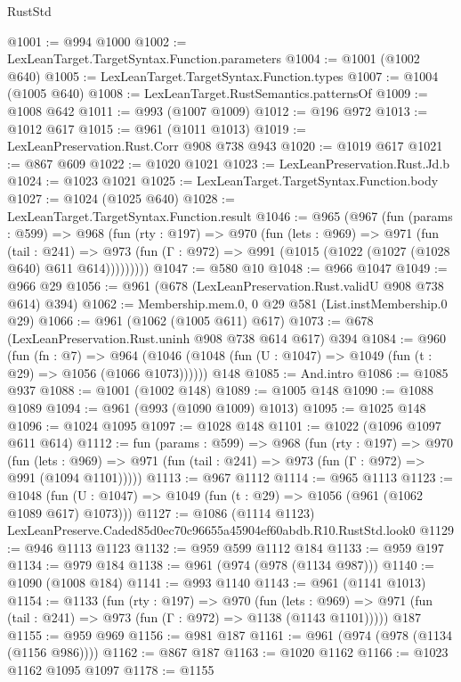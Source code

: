 \begin{lexlean}{RustStd}
\begin{coremodule}
@1001 := @994 @1000
@1002 := LexLeanTarget.TargetSyntax.Function.parameters
@1004 := @1001 (@1002 @640)
@1005 := LexLeanTarget.TargetSyntax.Function.types
@1007 := @1004 (@1005 @640)
@1008 := LexLeanTarget.RustSemantics.patternsOf
@1009 := @1008 @642
@1011 := @993 (@1007 @1009)
@1012 := @196 @972
@1013 := @1012 @617
@1015 := @961 (@1011 @1013)
@1019 := LexLeanPreservation.Rust.Corr @908 @738 @943
@1020 := @1019 @617
@1021 := @867 @609
@1022 := @1020 @1021
@1023 := LexLeanPreservation.Rust.Jd.b
@1024 := @1023 @1021
@1025 := LexLeanTarget.TargetSyntax.Function.body
@1027 := @1024 (@1025 @640)
@1028 := LexLeanTarget.TargetSyntax.Function.result
@1046 := @965
    (@967
      (fun (params : @599) =>
      @968
        (fun (rty : @197) =>
        @970
          (fun (lets : @969) =>
          @971
            (fun (tail : @241) =>
            @973 (fun (Γ : @972) => @991 (@1015 (@1022 (@1027 (@1028 @640) @611 @614)))))))))
@1047 := @580 @10
@1048 := @966 @1047
@1049 := @966 @29
@1056 := @961 (@678 (LexLeanPreservation.Rust.validU @908 @738 @614) @394)
@1062 := Membership.mem.{0, 0} @29 @581 (List.instMembership.{0} @29)
@1066 := @961 (@1062 (@1005 @611) @617)
@1073 := @678 (LexLeanPreservation.Rust.uninh @908 @738 @614 @617) @394
@1084 := @960
    (fun (fn : @7) =>
    @964 (@1046 (@1048 (fun (U : @1047) => @1049 (fun (t : @29) => @1056 (@1066 @1073))))))
    @148
@1085 := And.intro
@1086 := @1085 @937
@1088 := @1001 (@1002 @148)
@1089 := @1005 @148
@1090 := @1088 @1089
@1094 := @961 (@993 (@1090 @1009) @1013)
@1095 := @1025 @148
@1096 := @1024 @1095
@1097 := @1028 @148
@1101 := @1022 (@1096 @1097 @611 @614)
@1112 := fun (params : @599) =>
  @968
    (fun (rty : @197) =>
    @970
      (fun (lets : @969) =>
      @971 (fun (tail : @241) => @973 (fun (Γ : @972) => @991 (@1094 @1101)))))
@1113 := @967 @1112
@1114 := @965 @1113
@1123 := @1048 (fun (U : @1047) => @1049 (fun (t : @29) => @1056 (@961 (@1062 @1089 @617) @1073)))
@1127 := @1086 (@1114 @1123) LexLeanPreserve.Caded85d0ec70c96655a45904ef60abdb.R10.RustStd.look0
@1129 := @946 @1113 @1123
@1132 := @959 @599 @1112 @184
@1133 := @959 @197
@1134 := @979 @184
@1138 := @961 (@974 (@978 (@1134 @987)))
@1140 := @1090 (@1008 @184)
@1141 := @993 @1140
@1143 := @961 (@1141 @1013)
@1154 := @1133
    (fun (rty : @197) =>
    @970
      (fun (lets : @969) =>
      @971 (fun (tail : @241) => @973 (fun (Γ : @972) => @1138 (@1143 @1101)))))
    @187
@1155 := @959 @969
@1156 := @981 @187
@1161 := @961 (@974 (@978 (@1134 (@1156 @986))))
@1162 := @867 @187
@1163 := @1020 @1162
@1166 := @1023 @1162 @1095 @1097
@1178 := @1155

\end{coremodule}
\end{lexlean}

